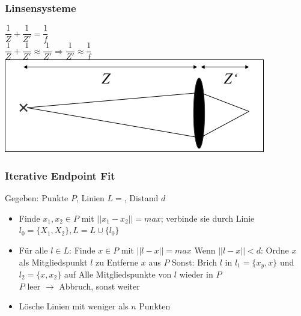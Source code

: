 \documentclass[8pt,a4paper,landscape]{scrartcl}
\begin{document}
\begin{multicols*}{3}
\subsubsection*{Linsensysteme}
$ \dfrac{1}{Z} + \dfrac{1}{Z'} = \dfrac{1}{f} $\\
$ \dfrac{1}{Z} + \dfrac{1}{Z'} \approx \dfrac{1}{Z'} \Rightarrow \dfrac{1}{Z'} \approx \dfrac{1}{f}$\\
\includegraphics[width=\columnwidth]{Linsensysteme}

\subsubsection*{Iterative Endpoint Fit}
Gegeben: Punkte $ P $, Linien $ L={} $, Distand $ d $\\
\begin{itemize}
	\setlength{\itemsep}{1pt}
	\setlength{\parskip}{0pt}
	\setlength{\parsep}{0pt}
	\item Finde $ x_1, x_2 \in P $ mit $ ||x_1-x_2||=max $; verbinde sie durch Linie $ l_0=\{X_1, X_2\}, L = L\cup \{l_0\} $
	\item Für alle $ l \in L $:
	\subitem Finde $ x \in P $ mit $ ||l-x||=max $
	\subitem Wenn $ ||l-x|| < d $:
	\subsubitem Ordne $ x $ als Mitgliedspunkt $ l $ zu
	\subsubitem Entferne $ x $ aus $ P $
	\subitem Sonst:
	\subsubitem Brich $ l $ in $ l_1 = \{x_y,x\} $ und $ l_2=\{x,x_2\} $ auf
	\subsubitem Alle Mitgliedspunkte von $ l $ wieder in $ P $\\
	\subitem $ P $ leer $ \rightarrow $ Abbruch, sonst weiter
	\item Lösche Linien mit weniger als $ n $ Punkten
\end{itemize}


\end{multicols*}
\end{document}
